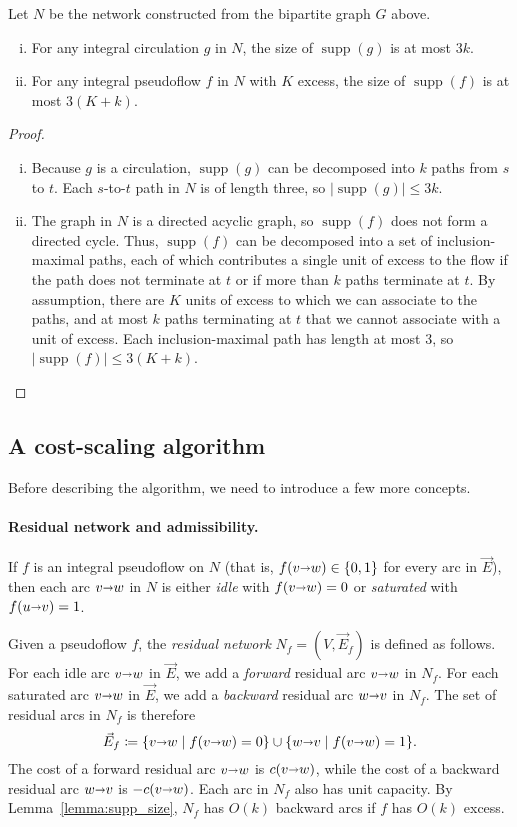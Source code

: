\documentclass[11pt]{article}
\makeatletter
\def\abs#1{\mathopen| #1 \mathclose|}		%
\def\arcto{\mathord\shortrightarrow}
\def\arc#1#2{#1\arcto#2}
\def\supp{\operatorname{supp}}
\theoremstyle{plain}
\numberwithin{figure}{section}
\def\EMPH#1{\textcolor{BrickRed}{{\emph{#1}}}}
\def\n@te#1{\textsf{\boldmath \textbf{$\langle\!\langle$#1$\rangle\!\rangle$}}\leavevmode}
\def\note#1{\textcolor{red}{\n@te{#1}}}
\makeatother
\begin{document}
\begin{lemma}
\label{lemma:supp_size}
Let $N$ be the network constructed from the bipartite graph $G$ above.
\begin{enumerate}[(i)]
\item For any integral circulation $g$ in $N$, the size of $\supp(g)$ is at most $3k$.
\item For any integral pseudoflow $f$ in $N$ with $K$ excess,
	the size of $\supp(f)$ is at most $3(K + k)$.
\end{enumerate}
\end{lemma}
\begin{proof}
\begin{enumerate}[(i)]
\item Because $g$ is a circulation, $\supp(g)$ can be decomposed into $k$  paths from $s$ to $t$.
	Each $s$-to-$t$ path in $N$ is of length three, so $\abs{\supp(g)} \leq 3k$.
\item The graph in $N$ is a directed acyclic graph, so $\supp(f)$ does not form a directed cycle.
	Thus, $\supp(f)$ can be decomposed into a set of inclusion-maximal paths,
	each of which contributes a single unit of excess to the flow if the path
	does not terminate at $t$ or if more than $k$ paths terminate at $t$.
	By assumption, there are $K$ units of excess to which we can associate to the paths,
	and at most $k$ paths terminating at $t$ that we cannot associate with a unit of excess.
	Each inclusion-maximal path has length at most 3, so $\abs{\supp(f)} \leq 3(K + k)$.
\end{enumerate}
\end{proof}

\subsection{A cost-scaling algorithm}
\label{SS:cost-scale}

Before describing the algorithm, we need to introduce a few more concepts.

\paragraph*{Residual network and admissibility.}
If $f$ is an integral pseudoflow on $N$
(that is, $f(\arc{v}{w}) \in \{0, 1\}$ for every arc in $\vec{E}$), then each arc
$\arc{v}{w}$ in $N$ is either \EMPH{idle} with $f(\arc{v}{w}) = 0$ or
\EMPH{saturated} with $f(\arc{u}{v}) = 1$.

Given a pseudoflow $f$, the \EMPH{residual network} $N_f = (V, \vec{E}_f)$ is
defined as follows.
For each idle arc $\arc{v}{w}$ in $\vec{E}$, we add a \EMPH{forward} residual
arc $\arc{v}{w}$ in $N_f$.
For each saturated arc $\arc{v}{w}$ in $\vec{E}$, we add a \EMPH{backward}
residual arc $\arc{w}{v}$ in $N_f$.
The set of residual arcs in $N_f$ is therefore
\[
\vec{E}_f \coloneqq \{\arc{v}{w} \mid f(\arc{v}{w}) = 0\} \cup \{\arc{w}{v} \mid f(\arc{v}{w}) = 1\}.
\]
The cost of a forward residual arc $\arc{v}{w}$ is $c(\arc{v}{w})$,
while the cost of a backward residual arc $\arc{w}{v}$ is $-c(\arc{v}{w})$.
Each arc in $N_f$ also has unit capacity.
By Lemma~\ref{lemma:supp_size}, $N_f$ has $O(k)$ backward arcs if $f$ has $O(k)$ excess.
\end{document}
